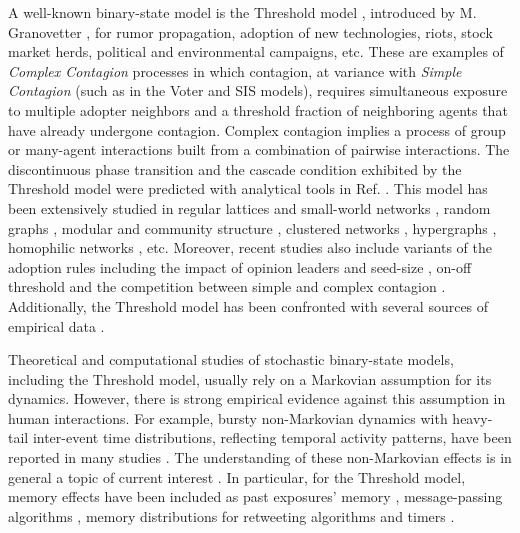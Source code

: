 A well-known binary-state model is the Threshold model \cite{watts-2002}, introduced by M. Granovetter \cite{granovetter-1978}, for rumor propagation, adoption of new technologies, riots, stock market herds, political and environmental campaigns, etc. These are examples of {\it Complex Contagion} processes \cite{centola-2007,unknown-author-2018} in which contagion, at variance with {\it Simple Contagion} (such as in the Voter and  SIS models), requires simultaneous exposure to multiple adopter neighbors and a threshold fraction of neighboring agents that have already undergone contagion. Complex contagion implies a process of group or many-agent interactions built from a combination of pairwise interactions. The discontinuous phase transition and the cascade condition exhibited by the Threshold model were predicted with analytical tools in Ref. \cite{watts-2002}. This model has been extensively studied in regular lattices and small-world networks \cite{centola-2007}, random graphs \cite{gleeson-2007},  modular and community structure \cite{gleeson-2008}, clustered networks \cite{hackett-2011,hackett-2013}, hypergraphs \cite{de-arruda-2020}, homophilic networks \cite{diaz-diaz-2022}, etc. Moreover, recent studies also include variants of the adoption rules including
the impact of opinion leaders \cite{liu-2018} and seed-size \cite{singh-2013}, on-off threshold \cite{dodds-2013} and the competition between simple and complex contagion \cite{czaplicka-2016,min-2018,diaz-diaz-2022}. Additionally, the Threshold model has been confronted with several sources of empirical data \cite{Centola-2010,karimi-2013,karsai-2014,rosenthal-2015,karsai-2016,mnsted-2017,unicomb-2018,guilbeault-2021}.


Theoretical and computational studies of stochastic binary-state models, including the Threshold model, usually rely on a Markovian assumption for its dynamics. 
However, there is strong empirical evidence against this assumption in human interactions.  For example, bursty non-Markovian dynamics with heavy-tail inter-event time distributions, reflecting temporal activity patterns,  have been reported in many studies \cite{iribarren-2009,karsai-2011,rybski-2012,zignani-2016,artime-2017,kumar-2020}. The understanding of these non-Markovian effects is in general a topic of current interest \cite{van-mieghem-2013,starnini-2017,peralta-2020C,peralta-2020A}. In particular, for the Threshold model, memory effects have been included as past exposures' memory \cite{dodds-2004}, message-passing algorithms \cite{shrestha-2014}, memory distributions for retweeting algorithms \cite{gleeson-2016} and timers \cite{oh-2018}.

